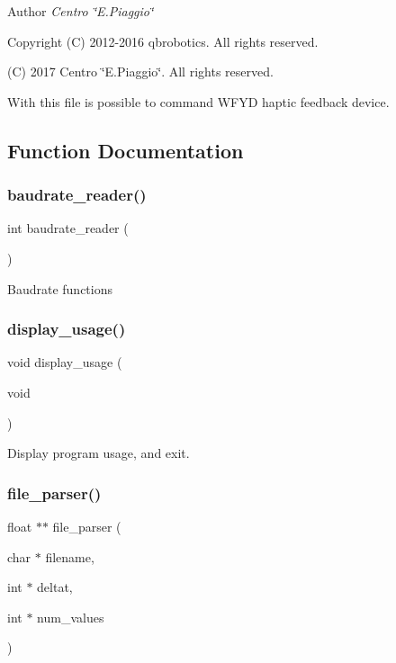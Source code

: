 \begin{DoxyAuthor}{Author}
{\itshape Centro \char`\"{}\+E.\+Piaggio\char`\"{}} 
\end{DoxyAuthor}
\begin{DoxyCopyright}{Copyright}
(C) 2012-\/2016 qbrobotics. All rights reserved. 

(C) 2017 Centro \char`\"{}\+E.\+Piaggio\char`\"{}. All rights reserved.
\end{DoxyCopyright}
With this file is possible to command W\+F\+YD haptic feedback device. 

\subsection{Function Documentation}
\mbox{\label{qbadmin_8c_a872d84bb02f7d8f4617246f0c6d37c43}} 
\subsubsection{baudrate\+\_\+reader()}
{\footnotesize\ttfamily int baudrate\+\_\+reader (\begin{DoxyParamCaption}{ }\end{DoxyParamCaption})}

Baudrate functions \mbox{\label{qbadmin_8c_acf5088e61b616f77674f62a9ba3b86b7}} 
\subsubsection{display\+\_\+usage()}
{\footnotesize\ttfamily void display\+\_\+usage (\begin{DoxyParamCaption}\item[{void}]{ }\end{DoxyParamCaption})}

Display program usage, and exit. \mbox{\label{qbadmin_8c_a98a5d602fbf649e7f9e8f851cb757f71}} 
\subsubsection{file\+\_\+parser()}
{\footnotesize\ttfamily float $\ast$$\ast$ file\+\_\+parser (\begin{DoxyParamCaption}\item[{char $\ast$}]{filename,  }\item[{int $\ast$}]{deltat,  }\item[{int $\ast$}]{num\+\_\+values }\end{DoxyParamCaption})}

